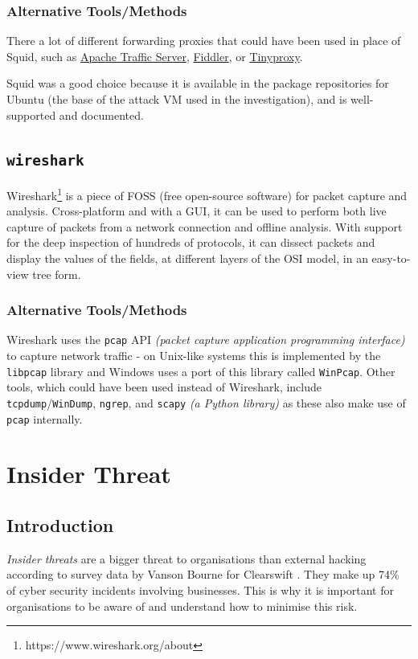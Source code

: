 \documentclass[12pt]{report}
\begin{document}
\subsection*{Alternative Tools/Methods}
There a lot of different forwarding proxies that could have been used in place of Squid, such as \href{https://docs.trafficserver.apache.org/en/5.3.x/admin/forward-proxy.en.html}{Apache Traffic Server}, \href{https://www.telerik.com/fiddler}{Fiddler}, or \href{https://tinyproxy.github.io/}{Tinyproxy}.

Squid was a good choice because it is available in the package repositories for Ubuntu (the base of the attack VM used in the investigation), and is well-supported and documented.

\section{\texttt{wireshark}}
Wireshark\footnote{https://www.wireshark.org/about} is a piece of FOSS (free open-source software) for packet capture and analysis. Cross-platform and with a GUI, it can be used to perform both live capture of packets from a network connection and offline analysis. With support for the deep inspection of hundreds of protocols, it can dissect packets and display the values of the fields, at different layers of the OSI model, in an easy-to-view tree form.
\subsection*{Alternative Tools/Methods}
Wireshark uses the \texttt{pcap} API \textit{(packet capture application programming interface)} to capture network traffic - on Unix-like systems this is implemented by the \texttt{libpcap} library and Windows uses a port of this library called \texttt{WinPcap}. Other tools, which could have been used instead of Wireshark, include \texttt{tcpdump}/\texttt{WinDump}, \texttt{ngrep}, and \texttt{scapy} \textit{(a Python library)} as these also make use of \texttt{pcap} internally.


\pagebreak
\chapter{Insider Threat}
\section{Introduction}
\textit{Insider threats} are a bigger threat to organisations than external hacking according to survey data by Vanson Bourne for Clearswift \citep{site:itpro:insiderthreats:20170922}. They make up 74\% of cyber security incidents involving businesses. This is why it is important for organisations to be aware of and understand how to minimise this risk.
\end{document}
